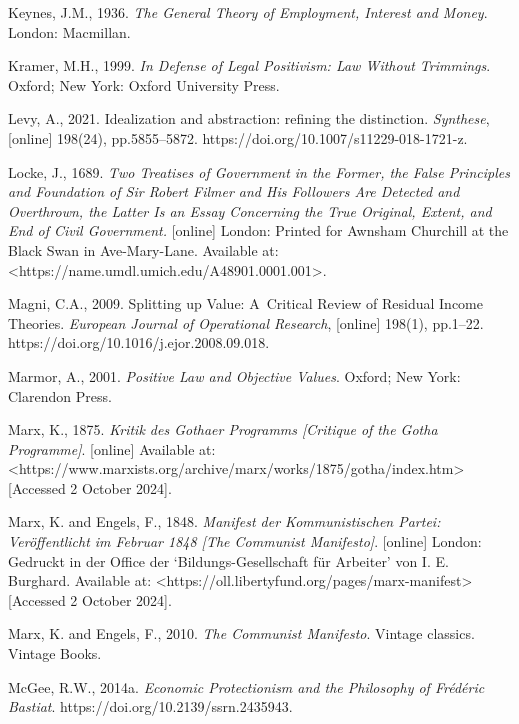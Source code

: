 Keynes, J.M., 1936. \textit{The General Theory of Employment, Interest and Money}. London: Macmillan.



Kramer, M.H., 1999. \textit{In Defense of Legal Positivism: Law Without Trimmings}. Oxford; New York: Oxford University Press.



Levy, A., 2021. Idealization and abstraction: refining the distinction. \textit{Synthese}, [online] 198(24), pp.5855–5872. https://doi.org/10.1007/s11229-018-1721-z.



Locke, J., 1689. \textit{Two Treatises of Government in the Former, the False Principles and Foundation of Sir Robert Filmer and His Followers Are Detected and Overthrown, the Latter Is an Essay Concerning the True Original, Extent, and End of Civil Government.} [online] London: Printed for Awnsham Churchill at the Black Swan in Ave-Mary-Lane. Available at: {\textless}https://name.umdl.umich.edu/A48901.0001.001{\textgreater}.



Magni, C.A., 2009. Splitting up Value: A~Critical Review of Residual Income Theories. \textit{European Journal of Operational Research}, [online] 198(1), pp.1–22. https://doi.org/10.1016/j.ejor.2008.09.018.



Marmor, A., 2001. \textit{Positive Law and Objective Values}. Oxford; New York: Clarendon Press.



Marx, K., 1875. \textit{Kritik des Gothaer Programms [Critique of the Gotha Programme]}. [online] Available at: {\textless}https://www.marxists.org/archive/marx/works/1875/gotha/index.htm{\textgreater} [Accessed 2 October 2024].



Marx, K. and Engels, F., 1848. \textit{Manifest der Kommunistischen Partei: Veröffentlicht im Februar 1848 [The Communist Manifesto]}. [online] London: Gedruckt in der Office der ‘Bildungs-Gesellschaft für Arbeiter' von I. E. Burghard. Available at: {\textless}https://oll.libertyfund.org/pages/marx-manifest{\textgreater} [Accessed 2 October 2024].



Marx, K. and Engels, F., 2010. \textit{The Communist Manifesto}. Vintage classics. Vintage Books.



McGee, R.W., 2014a. \textit{Economic Protectionism and the Philosophy of Frédéric Bastiat}. https://doi.org/10.2139/ssrn.2435943.



